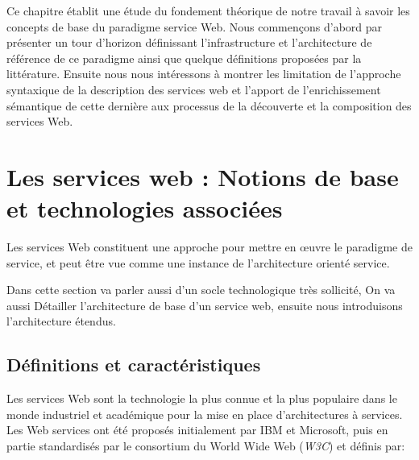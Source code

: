 

    Ce chapitre établit une étude du fondement théorique de notre travail à savoir les concepts de base du paradigme
    service Web.  Nous commençons d'abord par présenter un tour d'horizon définissant l'infrastructure et
    l'architecture de référence de ce paradigme ainsi que quelque définitions proposées par la littérature. Ensuite
    nous nous intéressons à montrer les limitation de l'approche syntaxique de la description des services web et l'apport
    de l'enrichissement sémantique de cette dernière aux processus de la découverte et la composition des services Web.\\

    \newpage
    
\section{Les services web : Notions de base et technologies associées} 
    Les services Web constituent une approche pour mettre en œuvre le paradigme de service, et peut être vue comme
    une instance de l'architecture orienté service.

    Dans cette section va parler aussi d'un socle technologique très sollicité, On va aussi Détailler l'architecture de base 
    d'un service web, ensuite nous introduisons l'architecture étendus.

    \subsection{Définitions et caractéristiques}
	Les services Web sont la technologie la plus connue et la plus populaire dans le monde industriel et
	académique pour la mise en place d’architectures à services. 
	Les Web services ont été proposés initialement par IBM \cite{kreger2001web} et Microsoft, puis en partie standardisés par le 
	consortium du World Wide Web (\emph{W3C}) et définis \cite{WSA} par:

